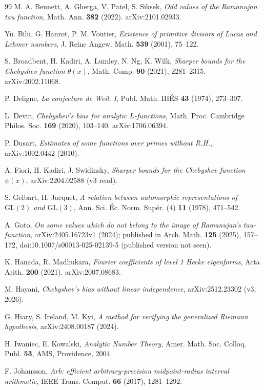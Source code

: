 \documentclass[11pt]{amsart}
\theoremstyle{definition}
\numberwithin{equation}{section}
\begin{document}
\begin{thebibliography}{99}
 M. A. Bennett, A. Gherga, V. Patel, S. Siksek, \emph{Odd values of the Ramanujan tau function}, Math. Ann. \textbf{382} (2022). arXiv:2101.02933.

 Yu. Bilu, G. Hanrot, P. M. Voutier, \emph{Existence of primitive divisors of Lucas and Lehmer numbers}, J. Reine Angew. Math. \textbf{539} (2001), 75--122.

 S. Broadbent, H. Kadiri, A. Lumley, N. Ng, K. Wilk, \emph{Sharper bounds for the Chebyshev function $\theta(x)$}, Math. Comp. \textbf{90} (2021), 2281--2315. arXiv:2002.11068.

 P. Deligne, \emph{La conjecture de Weil. I}, Publ. Math. IH\'ES \textbf{43} (1974), 273--307.

 L. Devin, \emph{Chebyshev's bias for analytic $L$-functions}, Math. Proc. Cambridge Philos. Soc. \textbf{169} (2020), 103--140. arXiv:1706.06394.

 P. Dusart, \emph{Estimates of some functions over primes without R.H.}, arXiv:1002.0442 (2010).

 A. Fiori, H. Kadiri, J. Swidinsky, \emph{Sharper bounds for the Chebyshev function $\psi(x)$}, arXiv:2204.02588 (v3 read).

 S. Gelbart, H. Jacquet, \emph{A relation between automorphic representations of $\mathrm{GL}(2)$ and $\mathrm{GL}(3)$}, Ann. Sci. \'Ec. Norm. Sup\'er. (4) \textbf{11} (1978), 471--542.

 A. Goto, \emph{On some values which do not belong to the image of Ramanujan's tau-function}, arXiv:2405.16723v1 (2024); published in Arch. Math. \textbf{125} (2025), 157--172, doi:10.1007/s00013-025-02139-5 (published version not seen).

 K. Hanada, R. Madhukara, \emph{Fourier coefficients of level 1 Hecke eigenforms}, Acta Arith. \textbf{200} (2021). arXiv:2007.08683.

 M. Hayani, \emph{Chebyshev's bias without linear independence}, arXiv:2512.23302 (v3, 2026).

 G. Hiary, S. Ireland, M. Kyi, \emph{A method for verifying the generalized Riemann hypothesis}, arXiv:2408.00187 (2024).

 H. Iwaniec, E. Kowalski, \emph{Analytic Number Theory}, Amer. Math. Soc. Colloq. Publ. \textbf{53}, AMS, Providence, 2004.

 F. Johansson, \emph{Arb: efficient arbitrary-precision midpoint-radius interval arithmetic}, IEEE Trans. Comput. \textbf{66} (2017), 1281--1292.


\end{thebibliography}
\end{document}
